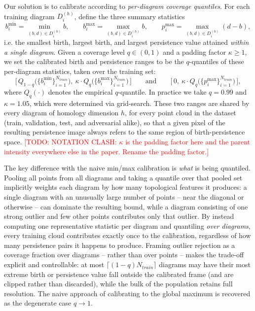 \documentclass[11pt,letterpaper]{article}
\newcommand{\1}{\mathds{1}}
\newcommand{\todo}[1]{\textcolor{red}{[TODO: #1]}}
\newcommand{\todo}[1]{}
\theoremstyle{plain}
\theoremstyle{definitioncolon}
\begin{document}
Our solution is to calibrate according to \emph{per-diagram coverage quantiles}.
For each training diagram $D_i^{(h)}$, define the three summary statistics
\begin{equation}
    b_i^{\min} = \min_{(b,d) \in D_i^{(h)}} b, \qquad
    b_i^{\max} = \max_{(b,d) \in D_i^{(h)}} b, \qquad
    p_i^{\max} = \max_{(b,d) \in D_i^{(h)}} (d - b),
\end{equation}
i.e. the smallest birth, largest birth, and largest persistence value attained
\emph{within a single diagram}. Given a coverage level $q \in (0,1)$ and a
padding factor $\kappa \geq 1$, we set the calibrated birth and persistence
ranges to be the $q$-quantiles of these per-diagram statistics, taken over the
training set:
\begin{equation}
    \big[\,Q_{1-q}\big(\{b_i^{\min}\}_{i=1}^{N_{train}}\big),\
    \kappa \cdot Q_{q}\big(\{b_i^{\max}\}_{i=1}^{N_{train}}\big)\,\big]
    \qquad \text{and} \qquad
    \big[\,0,\ \kappa \cdot
    Q_{q}\big(\{p_i^{\max}\}_{i=1}^{N_{train}}\big)\,\big],
\end{equation}
where $Q_q(\cdot)$ denotes the empirical $q$-quantile. In practice we take
$q = 0.99$ and $\kappa = 1.05$, which were determined via grid-search. These two
ranges are shared by every diagram of homology dimension $h$, for every point
cloud in the dataset (train, validation, test, and adversarial alike), so that a
given pixel of the resulting persistence image always refers to the same region
of birth-persistence space.
\todo{NOTATION CLASH: $\kappa$ is the padding factor here and the parent
intensity everywhere else in the paper. Rename the padding factor.}

The key difference with the naive min/max calibration is \emph{what} is being
quantiled. Pooling all points from all diagrams and taking a quantile over that
pooled set implicitly weights each diagram by how many topological features it
produces: a single diagram with an unusually large number of points -- near the
diagonal or otherwise -- can dominate the resulting bound, while a diagram
consisting of one strong outlier and few other points contributes only that
outlier. By instead computing one representative statistic per diagram and
quantiling \emph{over diagrams}, every training cloud contributes exactly once to
the calibration, regardless of how many persistence pairs it happens to produce.
Framing outlier rejection as a coverage fraction over diagrams -- rather than
over points -- makes the trade-off explicit and controllable: at most
$\lceil (1-q) N_{train} \rceil$ diagrams may have their most extreme birth or
persistence value fall outside the calibrated frame (and are clipped rather than
discarded), while the bulk of the population retains full resolution. The naive
approach of calibrating to the global maximum is recovered as the degenerate case
$q \to 1$.
\end{document}
